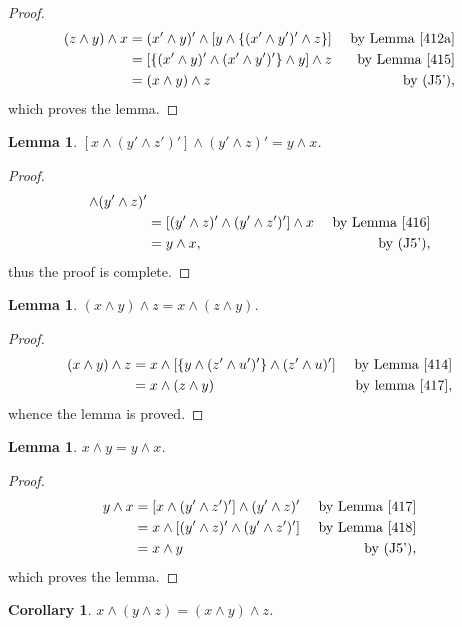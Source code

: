 \documentclass{amsart}
\theoremstyle{plain}
\newtheorem{corollary}[theorem]{Corollary}
\newtheorem{lemma}[theorem]{Lemma}
\theoremstyle{problem}
\theoremstyle{definition}
\theoremstyle{remark}
\numberwithin{equation}{section}
\begin{document}
\begin{proof}
\begin{align*}
   (z \land y) \land x
            &= (x' \land y)' \land [y \land \{(x' \land y')' \land z\}] &\text{ by  Lemma \ref{412a}}\\        
        &=[\{(x' \land y)' \land (x' \land y')'\} \land y] \land z  &\text{ by  Lemma \ref{415}}\\ 
        &= (x \land y) \land z &\text{ by (J5')},
\end{align*}
which proves the lemma.
\end{proof}

\begin{lemma} \label{417}
    $[x \land (y' \land z')'] \land (y' \land z)' = y \land x$.
\end{lemma}

\begin{proof}
 \begin{align*}
      [x \land (y' \land z')'] \land (y' \land z)' \\
            &= [(y' \land z)' \land (y' \land z')'] \land x &\text{ by  Lemma \ref{416}}\\ 
            &= y \land x, &\text{ by (J5')}, 
\end{align*}
thus the proof is complete.
\end{proof}

\begin{lemma} \label{418}
    $(x \land y) \land z  = x \land (z \land y)$.
\end{lemma}

\begin{proof}
\begin{align*}
    (x \land y) \land z
         &= x \land [\{y \land (z' \land u')'\} \land (z' \land u)'] &\text{ by  Lemma \ref{414}}  \\           
         &= x \land (z \land y) &\text{ by lemma \ref{417}},  
\end{align*}
whence the lemma is proved.
\end{proof}

\begin{lemma}\label{419}
    $x \land y  = y \land x$.
\end{lemma}
\begin{proof}
\begin{align*}
    y \land x &= [x \land (y' \land z')'] \land (y' \land z)' &\text{ by Lemma \ref{417}}\\    
              &= x \land [(y' \land z)' \land (y' \land z')'] &\text{ by  Lemma \ref{418}} \\   
              &= x \land y &\text{ by (J5')},
\end{align*}
which proves the lemma.
\end{proof}
\begin{corollary} \label{420}
    $x \land (y \land z)  = (x \land y) \land z$.
\end{corollary}
\end{document}
